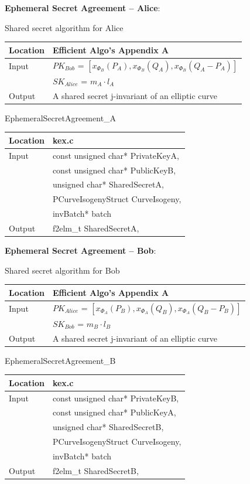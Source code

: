 \textbf{Ephemeral Secret Agreement -- Alice}:

	\parbox[t]{.35\linewidth}{
	\centering
	Shared secret algorithm for Alice
	\begin{tabular}{@{}ll@{}}
		\toprule
		Location & Efficient Algo's Appendix A \\
		\midrule
		Input & $PK_{Bob}$ = $[x_{\Phi_{B}}(P_{A}), x_{\Phi_{B}}(Q_{A}), x_{\Phi_{B}}(Q_{A} - P_{A})]$\\
		& $SK_{Alice}$ = $m_{A} \cdot l_{A}$\\
		\midrule
		Output & A shared secret j-invariant of an elliptic curve\\
		\bottomrule
	\end{tabular}}
	\hfill
	\parbox[t]{.35\linewidth}{
	\centering
	EphemeralSecretAgreement\_A
	\begin{tabular}{@{}ll@{}}
		\toprule
		Location & kex.c \\
		\midrule
		Input & const unsigned char* PrivateKeyA,\\
		& const unsigned char* PublicKeyB,\\
		& unsigned char* SharedSecretA,\\
		& PCurveIsogenyStruct CurveIsogeny,\\
		& invBatch* batch\\
		\midrule
		Output & f2elm\_t SharedSecretA,\\
		\bottomrule
	\end{tabular}}

\textbf{Ephemeral Secret Agreement -- Bob}:

	\parbox[t]{.35\linewidth}{
	\centering
	Shared secret algorithm for Bob
	\begin{tabular}{@{}ll@{}}
		\toprule
		Location & Efficient Algo's Appendix A \\
		\midrule
		Input & $PK_{Alice}$ = $[x_{\Phi_{A}}(P_{B}), x_{\Phi_{A}}(Q_{B}), x_{\Phi_{A}}(Q_{B} - P_{B})]$\\
		& $SK_{Bob}$ = $m_{B} \cdot l_{B}$\\
		\midrule
		Output & A shared secret j-invariant of an elliptic curve\\
		\bottomrule
	\end{tabular}}
	\hfill
	\parbox[t]{.35\linewidth}{
	\centering
	EphemeralSecretAgreement\_B
	\begin{tabular}{@{}ll@{}}
		\toprule
		Location & kex.c \\
		\midrule
		Input & const unsigned char* PrivateKeyB,\\
		& const unsigned char* PublicKeyA,\\
		& unsigned char* SharedSecretB,\\
		& PCurveIsogenyStruct CurveIsogeny,\\
		& invBatch* batch\\
		\midrule
		Output & f2elm\_t SharedSecretB,\\
		\bottomrule
	\end{tabular}}

